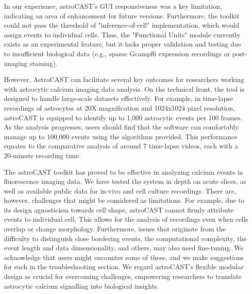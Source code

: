 In our experience, astroCAST's GUI responsiveness was a key limitation, indicating an area of enhancement for future versions. Furthermore, the toolkit could not pass the threshold of "inference-of-cell" implementation, which would assign events to individual cells. Thus, the "Functional Units" module currently exists as an experimental feature, but it lacks proper validation and testing due to insufficient biological data (e.g., sparse Gcampf6 expression recordings or post-imaging staining).

However, AstroCAST can facilitate several key outcomes for researchers working with astrocytic calcium imaging data analysis. On the technical front, the tool is designed to handle large-scale datasets effectively. For  example, in time-lapse recordings of astrocytes at 20X magnification and 1024x1024 pixel resolution, astroCAST is equipped to identify up to 1,000 astrocytic events per 100 frames. As the analysis progresses, users should find that the software can comfortably manage up to 100,000 events using the algorithms provided. This performance equates to the comparative analysis of around 7 time-lapse videos, each with a 20-minute recording time.

The astroCAST toolkit has proved to be effective in analyzing calcium events in fluorescence imaging data. We have tested the system in depth on acute slices, as well as available public data for in-vivo and cell  culture recordings. There are, however, challenges that might be considered as limitations. For example, due to its design agnosticism towards cell shape, astroCAST cannot firmly attribute events to individual cell. This allows for the analysis of recordings even when cells overlap or change morphology. Furthermore, issues that originate from the difficulty to distinguish close bordering events, the computational complexity, the event length and data dimensionality, and others, may also need fine-tuning. We acknowledge that users might encounter some of these, and we make suggestions for each in the troubleshooting section. We regard astroCAST's flexible modular design as crucial for overcoming challenges, empowering researchers to translate astrocytic calcium signalling into biological insights.

